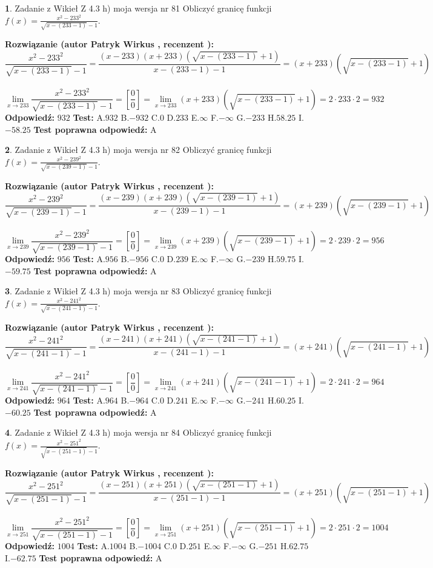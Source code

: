 \documentclass[12pt, a4paper]{article}
\theoremstyle{definition} %
\newtheorem{zad}{}
\newcommand{\zadStart}[1]{\begin{zad}#1\newline}
\newcommand{\zadStop}{\end{zad}}
\newcommand{\rozwStart}[2]{\noindent \textbf{Rozwiązanie (autor #1 , recenzent #2): }\newline}
\newcommand{\rozwStop}{\newline}
\newcommand{\odpStart}{\noindent \textbf{Odpowiedź:}\newline}
\newcommand{\odpStop}{\newline}
\newcommand{\testStart}{\noindent \textbf{Test:}\newline}
\newcommand{\testStop}{\newline}
\newcommand{\kluczStart}{\noindent \textbf{Test poprawna odpowiedź:}\newline}
\newcommand{\kluczStop}{\newline}
\begin{document}
\zadStart{Zadanie z Wikieł Z 4.3 h) moja wersja nr 81}
Obliczyć granicę funkcji $f(x)=\frac{x^{2} - 233^{2}}{\sqrt{x-(233-1)}-1}$.
\zadStop
\rozwStart{Patryk Wirkus}{}
$$\frac{x^{2} - 233^{2}}{\sqrt{x-(233-1)}-1}=\frac{(x-233)(x+233)(\sqrt{x-(233-1)}+1)}{x-(233-1)-1}=(x+233)(\sqrt{x-(233-1)}+1)$$
\\
$$\lim\limits_{x\to 233}\frac{x^{2} - 233^{2}}{\sqrt{x-(233-1)}-1}=[\frac{0}{0}]=
\lim\limits_{x\to 233}(x+233)(\sqrt{x-(233-1)}+1) = 2\cdot233 \cdot 2 = 932$$
\rozwStop
\odpStart
$932$
\odpStop
\testStart
A.$932$
B.$-932$
C.$0$
D.$233$
E.$\infty$
F.$-\infty$
G.$-233$
H.$58.25$
I.$-58.25$
\testStop
\kluczStart
A
\kluczStop



\zadStart{Zadanie z Wikieł Z 4.3 h) moja wersja nr 82}
Obliczyć granicę funkcji $f(x)=\frac{x^{2} - 239^{2}}{\sqrt{x-(239-1)}-1}$.
\zadStop
\rozwStart{Patryk Wirkus}{}
$$\frac{x^{2} - 239^{2}}{\sqrt{x-(239-1)}-1}=\frac{(x-239)(x+239)(\sqrt{x-(239-1)}+1)}{x-(239-1)-1}=(x+239)(\sqrt{x-(239-1)}+1)$$
\\
$$\lim\limits_{x\to 239}\frac{x^{2} - 239^{2}}{\sqrt{x-(239-1)}-1}=[\frac{0}{0}]=
\lim\limits_{x\to 239}(x+239)(\sqrt{x-(239-1)}+1) = 2\cdot239 \cdot 2 = 956$$
\rozwStop
\odpStart
$956$
\odpStop
\testStart
A.$956$
B.$-956$
C.$0$
D.$239$
E.$\infty$
F.$-\infty$
G.$-239$
H.$59.75$
I.$-59.75$
\testStop
\kluczStart
A
\kluczStop



\zadStart{Zadanie z Wikieł Z 4.3 h) moja wersja nr 83}
Obliczyć granicę funkcji $f(x)=\frac{x^{2} - 241^{2}}{\sqrt{x-(241-1)}-1}$.
\zadStop
\rozwStart{Patryk Wirkus}{}
$$\frac{x^{2} - 241^{2}}{\sqrt{x-(241-1)}-1}=\frac{(x-241)(x+241)(\sqrt{x-(241-1)}+1)}{x-(241-1)-1}=(x+241)(\sqrt{x-(241-1)}+1)$$
\\
$$\lim\limits_{x\to 241}\frac{x^{2} - 241^{2}}{\sqrt{x-(241-1)}-1}=[\frac{0}{0}]=
\lim\limits_{x\to 241}(x+241)(\sqrt{x-(241-1)}+1) = 2\cdot241 \cdot 2 = 964$$
\rozwStop
\odpStart
$964$
\odpStop
\testStart
A.$964$
B.$-964$
C.$0$
D.$241$
E.$\infty$
F.$-\infty$
G.$-241$
H.$60.25$
I.$-60.25$
\testStop
\kluczStart
A
\kluczStop



\zadStart{Zadanie z Wikieł Z 4.3 h) moja wersja nr 84}
Obliczyć granicę funkcji $f(x)=\frac{x^{2} - 251^{2}}{\sqrt{x-(251-1)}-1}$.
\zadStop
\rozwStart{Patryk Wirkus}{}
$$\frac{x^{2} - 251^{2}}{\sqrt{x-(251-1)}-1}=\frac{(x-251)(x+251)(\sqrt{x-(251-1)}+1)}{x-(251-1)-1}=(x+251)(\sqrt{x-(251-1)}+1)$$
\\
$$\lim\limits_{x\to 251}\frac{x^{2} - 251^{2}}{\sqrt{x-(251-1)}-1}=[\frac{0}{0}]=
\lim\limits_{x\to 251}(x+251)(\sqrt{x-(251-1)}+1) = 2\cdot251 \cdot 2 = 1004$$
\rozwStop
\odpStart
$1004$
\odpStop
\testStart
A.$1004$
B.$-1004$
C.$0$
D.$251$
E.$\infty$
F.$-\infty$
G.$-251$
H.$62.75$
I.$-62.75$
\testStop
\kluczStart
A
\kluczStop
\end{document}
